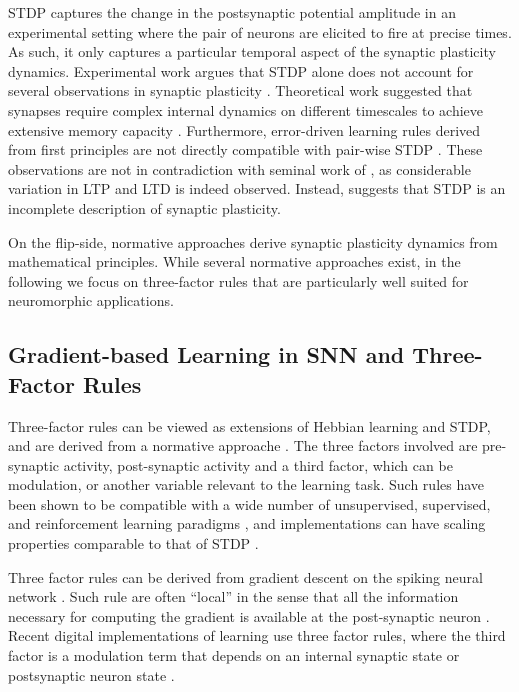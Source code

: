 \documentclass[english]{article}
\renewcommand{\cite}{\citep}
\begin{document}
\ac{STDP} captures the change in the postsynaptic potential amplitude in an experimental setting \cite{Bi_Poo98_synamodi} where the pair of neurons are elicited to fire at precise times. As such, it only captures a particular temporal aspect of the synaptic plasticity dynamics.
Experimental work argues that \ac{STDP} alone does not account for several observations in synaptic plasticity \cite{Shouval_etal10_spiktimi}.
Theoretical work suggested that synapses require complex internal dynamics on different timescales to achieve extensive memory capacity \cite{Lahiri_Ganguli13_memofron}.
Furthermore, error-driven learning rules derived from first principles are not directly compatible with pair-wise \ac{STDP} \cite{Pfister_etal06_optispik}.
These observations are not in contradiction with seminal work of \cite{Bi_Poo98_synamodi}, as considerable variation in LTP and LTD is indeed observed. Instead, \cite{Pfister_etal06_optispik} suggests that \ac{STDP} is an incomplete description of synaptic plasticity.

On the flip-side, normative approaches derive synaptic plasticity dynamics from mathematical principles. 
While several normative approaches exist, in the following we focus on three-factor rules that are particularly well suited for neuromorphic applications.


\subsection{Gradient-based Learning in \acl{SNN} and Three-Factor Rules}
Three-factor rules can be viewed as extensions of Hebbian learning and \ac{STDP}, and are derived from a normative approache \cite{Urbanczik_Senn14_learby}.
The three factors involved are pre-synaptic activity, post-synaptic activity and a third factor, which can be modulation, or another variable relevant to the learning task. 
Such rules have been shown to be compatible with a wide number of unsupervised, supervised, and reinforcement learning paradigms \cite{Urbanczik_Senn14_learby}, and implementations can have scaling properties comparable to that of \ac{STDP} \cite{Detorakis_etal18_neursyna}.

Three factor rules can be derived from gradient descent on the spiking neural network \cite{Pfister_etal06_optispik,Neftci_etal19_surrgrad}. 
Such rule are often ``local'' in the sense that all the information necessary for computing the gradient is available at the post-synaptic neuron \cite{Neftci18_datapowe}.
Recent digital implementations of learning use three factor rules, where the third factor is a modulation term that depends on an internal synaptic state \cite{Davies_etal18_loihneur} or postsynaptic neuron state \cite{Detorakis_etal18_neursyna}.
\end{document}
